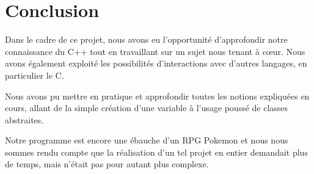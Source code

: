\vspace*{3cm}

\section*{Conclusion}
{}
\vspace*{1cm}

Dans le cadre de ce projet, nous avons eu l'opportunité d'approfondir notre connaissance du C++ tout en travaillant sur un sujet nous tenant à cœur. Nous avons également exploité les possibilités d'interactions avec d'autres langages, en particulier le C. 

Nous avons pu mettre en pratique et approfondir toutes les notions expliquées en cours, allant de la simple création d'une variable à l'usage poussé de classes abstraites. 

Notre programme est encore une ébauche d'un RPG Pokemon et nous nous sommes rendu compte que la réalisation d'un tel projet en entier demandait plus de temps, mais n'était pas pour autant plus complexe. 
\vspace*{3cm}

